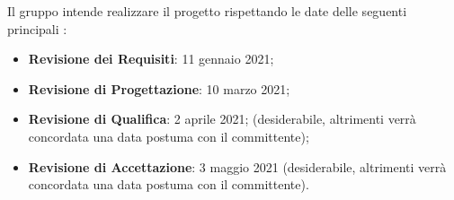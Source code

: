 Il gruppo \Gruppo{} intende realizzare il progetto \NomeProgetto{} rispettando le date delle seguenti principali :
\begin{itemize}
    \item \textbf{Revisione dei Requisiti}: 11 gennaio 2021;
    \item \textbf{Revisione di Progettazione}: 10 marzo 2021;
    \item \textbf{Revisione di Qualifica}: 2 aprile 2021; (desiderabile, altrimenti verrà concordata una data postuma con il committente);
    \item \textbf{Revisione di Accettazione}: 3 maggio 2021 (desiderabile, altrimenti verrà concordata una data postuma con il committente).
\end{itemize}